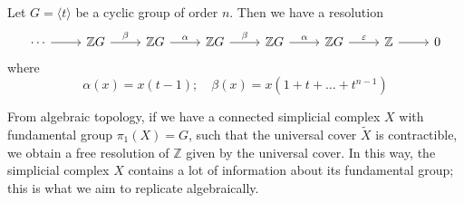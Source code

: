 \begin{example}
    Let \( G = \langle t \rangle \) be a cyclic group of order \( n \).
    Then we have a resolution
\[\begin{tikzcd}
	\cdots & {\mathbb Z G} & {\mathbb Z G} & {\mathbb Z G} & {\mathbb Z G} & {\mathbb Z G} & {\mathbb Z} & 0
	\arrow["\beta", from=1-4, to=1-5]
	\arrow["\alpha", from=1-5, to=1-6]
	\arrow["\varepsilon", from=1-6, to=1-7]
	\arrow[from=1-7, to=1-8]
	\arrow["\alpha", from=1-3, to=1-4]
	\arrow["\beta", from=1-2, to=1-3]
	\arrow[from=1-1, to=1-2]
\end{tikzcd}\]
    where
    \[ \alpha(x) = x(t-1);\quad \beta(x) = x(1 + t + \dots + t^{n-1}) \]
\end{example}
From algebraic topology, if we have a connected simplicial complex \( X \) with fundamental group \( \pi_1(X) = G \), such that the universal cover \( \widetilde X \) is contractible, we obtain a free resolution of \( \mathbb Z \) given by the universal cover.
In this way, the simplicial complex \( X \) contains a lot of information about its fundamental group; this is what we aim to replicate algebraically.

